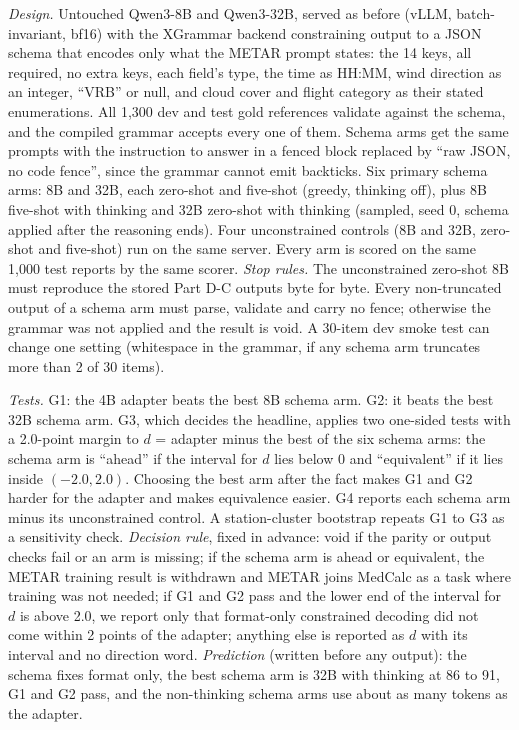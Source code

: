 \documentclass[11pt]{article}
\begin{document}
\emph{Design.} Untouched Qwen3-8B and Qwen3-32B, served as before (vLLM, batch-invariant, bf16) with the XGrammar
backend constraining output to a JSON schema that encodes only what the METAR prompt states: the 14 keys, all
required, no extra keys, each field's type, the time as HH:MM, wind direction as an integer, ``VRB'' or null, and
cloud cover and flight category as their stated enumerations. All 1,300 dev and test gold references validate against
the schema, and the compiled grammar accepts every one of them. Schema arms get the same prompts with the instruction
to answer in a fenced block replaced by ``raw JSON, no code fence'', since the grammar cannot emit backticks. Six
primary schema arms: 8B and 32B, each zero-shot and five-shot (greedy, thinking off), plus 8B five-shot with
thinking and 32B zero-shot with thinking (sampled, seed 0, schema applied after the reasoning ends). Four
unconstrained controls (8B and 32B, zero-shot and five-shot) run on the same server. Every arm is scored on the same
1,000 test reports by the same scorer. \emph{Stop rules.} The unconstrained zero-shot 8B must reproduce the stored
Part D-C outputs byte for byte. Every non-truncated output of a schema arm must parse, validate and carry no fence;
otherwise the grammar was not applied and the result is void. A 30-item dev smoke test can change one setting
(whitespace in the grammar, if any schema arm truncates more than 2 of 30 items).

\emph{Tests.} G1: the 4B adapter beats the best 8B schema arm. G2: it beats the best 32B schema arm. G3, which
decides the headline, applies two one-sided tests with a 2.0-point margin to $d$ = adapter minus the best of the six
schema arms: the schema arm is ``ahead'' if the interval for $d$ lies below 0 and ``equivalent'' if it lies inside
$(-2.0, 2.0)$. Choosing the best arm after the fact makes G1 and G2 harder for the adapter and makes equivalence
easier. G4 reports each schema arm minus its unconstrained control. A station-cluster bootstrap repeats G1 to G3 as a
sensitivity check. \emph{Decision rule}, fixed in advance: void if the parity or output checks fail or an arm is
missing; if the schema arm is ahead or equivalent, the METAR training result is withdrawn and METAR joins MedCalc as a
task where training was not needed; if G1 and G2 pass and the lower end of the interval for $d$ is above 2.0, we
report only that format-only constrained decoding did not come within 2 points of the adapter; anything else is
reported as $d$ with its interval and no direction word. \emph{Prediction} (written before any output): the schema
fixes format only, the best schema arm is 32B with thinking at 86 to 91, G1 and G2 pass, and the non-thinking schema
arms use about as many tokens as the adapter.
\end{document}
